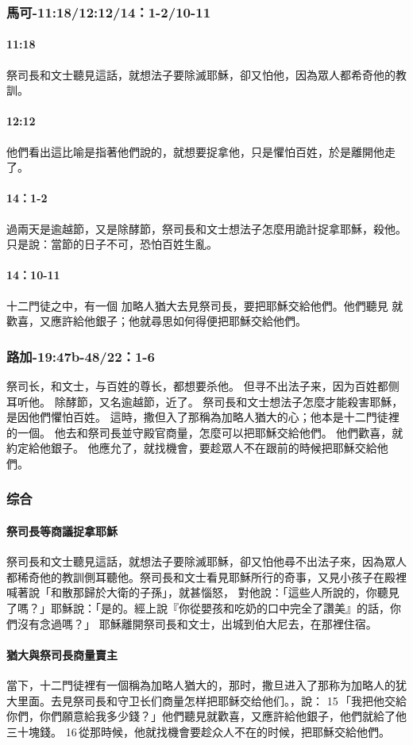 \subsubsection{馬可-11:18/12:12/14：1-2/10-11}
\paragraph{11:18}
祭司長和文士聽見這話，就想法子要除滅耶穌，卻又怕他，因為眾人都希奇他的教訓。
\paragraph{12:12}
他們看出這比喻是指著他們說的，就想要捉拿他，只是懼怕百姓，於是離開他走了。
\paragraph{14：1-2}
過兩天是逾越節，又是除酵節，祭司長和文士想法子怎麼用詭計捉拿耶穌，殺他。只是說：當節的日子不可，恐怕百姓生亂。
\paragraph{14：10-11}
十二門徒之中，有一個 加略人猶大去見祭司長，要把耶穌交給他們。他們聽見 就歡喜，又應許給他銀子；他就尋思如何得便把耶穌交給他們。
\subsubsection{路加-19:47b-48/22：1-6}
祭司长，和文士，与百姓的尊长，都想要杀他。 但寻不出法子来，因为百姓都侧耳听他。
除酵節，又名逾越節，近了。
祭司長和文士想法子怎麼才能殺害耶穌，是因他們懼怕百姓。
這時，撒但入了那稱為加略人猶大的心；他本是十二門徒裡的一個。
他去和祭司長並守殿官商量，怎麼可以把耶穌交給他們。
他們歡喜，就約定給他銀子。
他應允了，就找機會，要趁眾人不在跟前的時候把耶穌交給他們。
\subsubsection{综合}
\paragraph{祭司長等商議捉拿耶穌}
祭司長和文士聽見這話，就想法子要除滅耶穌，卻又怕他尋不出法子來，因為眾人都稀奇他的教訓側耳聽他。祭司長和文士看見耶穌所行的奇事，又見小孩子在殿裡喊著說「和散那歸於大衛的子孫」，就甚惱怒， 對他說：「這些人所說的，你聽見了嗎？」耶穌說：「是的。經上說『你從嬰孩和吃奶的口中完全了讚美』的話，你們沒有念過嗎？」
耶穌離開祭司長和文士，出城到伯大尼去，在那裡住宿。
\paragraph{猶大與祭司長商量賣主}
當下，十二門徒裡有一個稱為加略人猶大的，那时，撒旦进入了那称为加略人的犹大里面。去見祭司長和守卫长们商量怎样把耶稣交给他们。，說： 15 「我把他交給你們，你們願意給我多少錢？」他們聽見就歡喜，又應許給他銀子，他們就給了他三十塊錢。 16 從那時候，他就找機會要趁众人不在的时候，把耶穌交給他們。